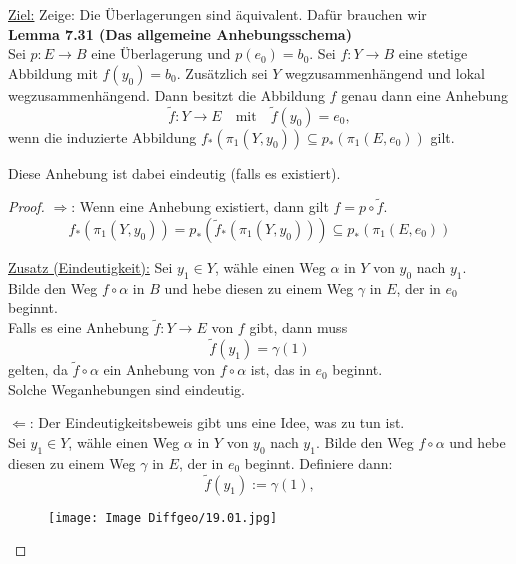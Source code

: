 \documentclass[fleqn, 12pt, letterpaper]{article}
\begin{document}
\underline{Ziel:} Zeige: Die Überlagerungen sind äquivalent. Dafür brauchen wir\\

\textbf{Lemma 7.31 (Das allgemeine Anhebungsschema)} \\
Sei \( p : E \to B \) eine Überlagerung und \( p(e_0) = b_0 \). Sei \( f : Y \to B \) eine stetige Abbildung mit \( f(y_0) = b_0 \). Zusätzlich sei \( Y \) wegzusammenhängend und lokal wegzusammenhängend. Dann besitzt die Abbildung \( f \) genau dann eine Anhebung 
\[
\tilde{f} : Y \to E \quad \text{mit} \quad \tilde{f}(y_0) = e_0,
\]
wenn die induzierte Abbildung \( f_* \left( \pi_1(Y, y_0) \right) \subseteq p_* \left( \pi_1(E, e_0) \right) \) gilt.

Diese Anhebung ist dabei eindeutig (falls es existiert).

\begin{proof}
\underline{\( \Rightarrow \)}: Wenn eine Anhebung existiert, dann gilt $f=p\circ \tilde{f}$.\\
\[
f_* \left( \pi_1(Y, y_0) \right) 
= p_* \left( \widetilde{f}_* \left( \pi_1(Y, y_0) \right) \right) 
\subseteq p_* \left( \pi_1(E, e_0) \right)
\]

\underline{Zusatz (Eindeutigkeit):} Sei \( y_1 \in Y \), wähle einen Weg \( \alpha \) in \( Y \) von \( y_0 \) nach \( y_1 \). \\
Bilde den Weg \( f \circ \alpha \) in \( B \) und hebe diesen zu einem Weg \( \gamma \) in \( E \), der in \( e_0 \) beginnt. \\
Falls es eine Anhebung \( \tilde{f} : Y \to E \) von \( f \) gibt, dann muss
\[
\tilde{f}(y_1) = \gamma(1)
\]
gelten, da \( \tilde{f} \circ \alpha \) ein Anhebung von \( f \circ \alpha \) ist, das in \( e_0 \) beginnt. \\
Solche Weganhebungen sind eindeutig.

\vspace{1em}
\underline{\( \Leftarrow \)}: Der Eindeutigkeitsbeweis gibt uns eine Idee, was zu tun ist.\\

Sei \( y_1 \in Y \), wähle einen Weg \( \alpha \) in \( Y \) von \( y_0 \) nach \( y_1 \). Bilde den Weg \( f \circ \alpha \) und hebe diesen zu einem Weg $\gamma$ in \( E \), der in \( e_0 \) beginnt. Definiere dann:
\[
\tilde{f}(y_1) :=\gamma(1),
\]

  \begin{figure}[H]
    \centering
    \texttt{[image: Image Diffgeo/19.01.jpg]}
 \end{figure}


\end{proof}
\end{document}
